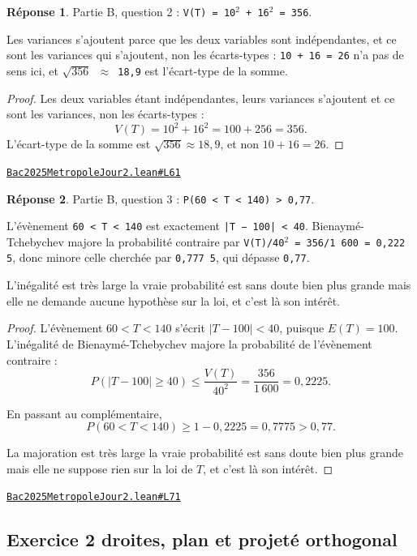 \documentclass[11pt,a4paper]{article}
\theoremstyle{definition}
\theoremstyle{plain}
\theoremstyle{definition}
\newtheorem*{reponse}{Réponse}
\newcommand{\source}[2]{\par\smallskip\noindent\hfill{\footnotesize\href{#1}{\texttt{#2}}}\par\smallskip}
\begin{document}
\begin{reponse}
Partie B, question 2 : \texttt{V(T) = 10\(^{2}\) + 16\(^{2}\) = 356}.

Les variances s'ajoutent parce que les deux variables sont indépendantes, et ce sont
les variances qui s'ajoutent, non les écarts-types : \texttt{10 + 16 = 26} n'a pas de sens
ici, et \texttt{\(\sqrt{356}\) \(\approx\) 18,9} est l'écart-type de la somme.
\end{reponse}
\begin{proof}
Les deux variables étant indépendantes, leurs variances s'ajoutent \textemdash{} et ce
sont les variances, non les écarts-types :
\[ V(T) = 10^2 + 16^2 = 100 + 256 = 356 . \]
L'écart-type de la somme est $\sqrt{356} \approx 18{,}9$, et non $10 + 16 = 26$.
\end{proof}
\source{https://github.com/Commutator-IO/learn-lean/blob/main/exams/2025/Bac2025MetropoleJour2.lean\#L61}{Bac2025MetropoleJour2.lean\#L61}

\begin{reponse}
Partie B, question 3 : \texttt{P(60 < T < 140) > 0,77}.

L'évènement \texttt{60 < T < 140} est exactement \texttt{|T − 100| < 40}. Bienaymé-Tchebychev majore
la probabilité contraire par \texttt{V(T)/40\(^{2}\) = 356/1 600 = 0,222 5}, donc minore celle
cherchée par \texttt{0,777 5}, qui dépasse \texttt{0,77}.

L'inégalité est très large \textemdash{} la vraie probabilité est sans doute bien plus grande \textemdash{}
mais elle ne demande aucune hypothèse sur la loi, et c'est là son intérêt.
\end{reponse}
\begin{proof}
L'évènement $60 < T < 140$ s'écrit $|T - 100| < 40$, puisque $E(T) = 100$. L'inégalité de
Bienaymé-Tchebychev majore la probabilité de l'évènement contraire :
\[ P(|T - 100| \ge 40) \le \frac{V(T)}{40^2} = \frac{356}{1\,600} = 0{,}2225 . \]

En passant au complémentaire,
\[ P(60 < T < 140) \ge 1 - 0{,}2225 = 0{,}7775 > 0{,}77 . \]

La majoration est très large \textemdash{} la vraie probabilité est sans doute bien plus
grande \textemdash{} mais elle ne suppose rien sur la loi de $T$, et c'est là son intérêt.
\end{proof}
\source{https://github.com/Commutator-IO/learn-lean/blob/main/exams/2025/Bac2025MetropoleJour2.lean\#L71}{Bac2025MetropoleJour2.lean\#L71}

\subsection{Exercice 2 \textemdash{} droites, plan et projeté orthogonal}
\end{document}
